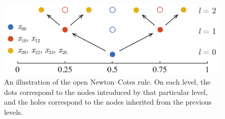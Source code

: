 \begin{figure}[t]
  \centering
  \includegraphics[width=1.0\columnwidth]{include/assets/figures/grid.pdf}
  \vspace{-1em}
  \caption{
    An illustration of the open Newton--Cotes rule. On each level, the dots
    correspond to the nodes introduced by that particular level, and the holes
    correspond to the nodes inherited from the previous levels.
  }
\end{figure}
